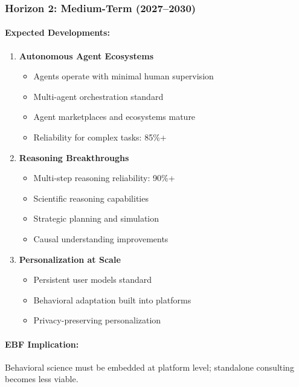 \subsubsection{Horizon 2: Medium-Term (2027--2030)}

\paragraph{Expected Developments:}
\begin{enumerate}
    \item \textbf{Autonomous Agent Ecosystems}
    \begin{itemize}
        \item Agents operate with minimal human supervision
        \item Multi-agent orchestration standard
        \item Agent marketplaces and ecosystems mature
        \item Reliability for complex tasks: 85\%+
    \end{itemize}

    \item \textbf{Reasoning Breakthroughs}
    \begin{itemize}
        \item Multi-step reasoning reliability: 90\%+
        \item Scientific reasoning capabilities
        \item Strategic planning and simulation
        \item Causal understanding improvements
    \end{itemize}

    \item \textbf{Personalization at Scale}
    \begin{itemize}
        \item Persistent user models standard
        \item Behavioral adaptation built into platforms
        \item Privacy-preserving personalization
    \end{itemize}
\end{enumerate}

\paragraph{EBF Implication:} Behavioral science must be embedded at platform
level; standalone consulting becomes less viable.

